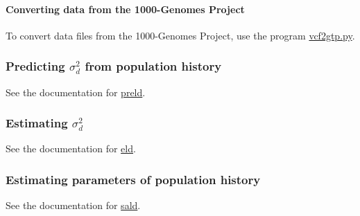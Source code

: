 \paragraph*{Converting data from the 1000-\/\+Genomes Project}

To convert data files from the 1000-\/\+Genomes Project, use the program \hyperlink{vcf2gtp_8py_vcf2gtp}{vcf2gtp.py}.

\subsubsection*{Predicting $\sigma_d^2$ from population history}

See the documentation for \hyperlink{preld_8c_preld}{preld}.

\subsubsection*{Estimating $\sigma_d^2$}

See the documentation for \hyperlink{eld_8c_eld}{eld}.

\subsubsection*{Estimating parameters of population history}

See the documentation for \hyperlink{sald_8c_sald}{sald}. 